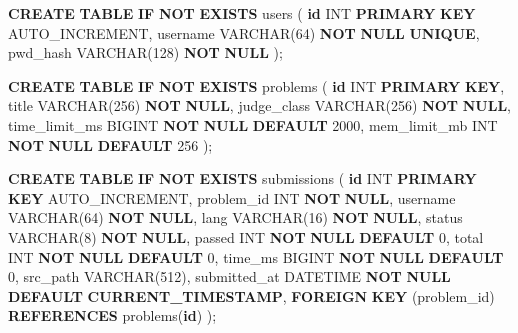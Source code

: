 \documentclass[
  11pt,
]{ctexart}
\newenvironment{Shaded}{\begin{snugshade}}{\end{snugshade}}
\newcommand{\ControlFlowTok}[1]{\textcolor[rgb]{0.13,0.29,0.53}{\textbf{#1}}}
\newcommand{\DataTypeTok}[1]{\textcolor[rgb]{0.13,0.29,0.53}{#1}}
\newcommand{\DecValTok}[1]{\textcolor[rgb]{0.00,0.00,0.81}{#1}}
\newcommand{\FunctionTok}[1]{\textcolor[rgb]{0.13,0.29,0.53}{\textbf{#1}}}
\newcommand{\KeywordTok}[1]{\textcolor[rgb]{0.13,0.29,0.53}{\textbf{#1}}}
\newcommand{\NormalTok}[1]{#1}
\begin{document}
\begin{Shaded}
\begin{Highlighting}[]
\KeywordTok{CREATE} \KeywordTok{TABLE} \ControlFlowTok{IF} \KeywordTok{NOT} \KeywordTok{EXISTS}\NormalTok{ users (}
    \KeywordTok{id}       \DataTypeTok{INT} \KeywordTok{PRIMARY} \KeywordTok{KEY}\NormalTok{ AUTO\_INCREMENT,}
\NormalTok{    username }\DataTypeTok{VARCHAR}\NormalTok{(}\DecValTok{64}\NormalTok{) }\KeywordTok{NOT} \KeywordTok{NULL} \KeywordTok{UNIQUE}\NormalTok{,}
\NormalTok{    pwd\_hash }\DataTypeTok{VARCHAR}\NormalTok{(}\DecValTok{128}\NormalTok{) }\KeywordTok{NOT} \KeywordTok{NULL}
\NormalTok{);}

\KeywordTok{CREATE} \KeywordTok{TABLE} \ControlFlowTok{IF} \KeywordTok{NOT} \KeywordTok{EXISTS}\NormalTok{ problems (}
    \KeywordTok{id}             \DataTypeTok{INT} \KeywordTok{PRIMARY} \KeywordTok{KEY}\NormalTok{,}
\NormalTok{    title          }\DataTypeTok{VARCHAR}\NormalTok{(}\DecValTok{256}\NormalTok{) }\KeywordTok{NOT} \KeywordTok{NULL}\NormalTok{,}
\NormalTok{    judge\_class    }\DataTypeTok{VARCHAR}\NormalTok{(}\DecValTok{256}\NormalTok{) }\KeywordTok{NOT} \KeywordTok{NULL}\NormalTok{,}
\NormalTok{    time\_limit\_ms  BIGINT }\KeywordTok{NOT} \KeywordTok{NULL} \KeywordTok{DEFAULT} \DecValTok{2000}\NormalTok{,}
\NormalTok{    mem\_limit\_mb   }\DataTypeTok{INT}    \KeywordTok{NOT} \KeywordTok{NULL} \KeywordTok{DEFAULT} \DecValTok{256}
\NormalTok{);}

\KeywordTok{CREATE} \KeywordTok{TABLE} \ControlFlowTok{IF} \KeywordTok{NOT} \KeywordTok{EXISTS}\NormalTok{ submissions (}
    \KeywordTok{id}          \DataTypeTok{INT} \KeywordTok{PRIMARY} \KeywordTok{KEY}\NormalTok{ AUTO\_INCREMENT,}
\NormalTok{    problem\_id  }\DataTypeTok{INT}         \KeywordTok{NOT} \KeywordTok{NULL}\NormalTok{,}
\NormalTok{    username    }\DataTypeTok{VARCHAR}\NormalTok{(}\DecValTok{64}\NormalTok{) }\KeywordTok{NOT} \KeywordTok{NULL}\NormalTok{,}
\NormalTok{    lang        }\DataTypeTok{VARCHAR}\NormalTok{(}\DecValTok{16}\NormalTok{) }\KeywordTok{NOT} \KeywordTok{NULL}\NormalTok{,}
\NormalTok{    status      }\DataTypeTok{VARCHAR}\NormalTok{(}\DecValTok{8}\NormalTok{)  }\KeywordTok{NOT} \KeywordTok{NULL}\NormalTok{,}
\NormalTok{    passed      }\DataTypeTok{INT}         \KeywordTok{NOT} \KeywordTok{NULL} \KeywordTok{DEFAULT} \DecValTok{0}\NormalTok{,}
\NormalTok{    total       }\DataTypeTok{INT}         \KeywordTok{NOT} \KeywordTok{NULL} \KeywordTok{DEFAULT} \DecValTok{0}\NormalTok{,}
\NormalTok{    time\_ms     BIGINT      }\KeywordTok{NOT} \KeywordTok{NULL} \KeywordTok{DEFAULT} \DecValTok{0}\NormalTok{,}
\NormalTok{    src\_path    }\DataTypeTok{VARCHAR}\NormalTok{(}\DecValTok{512}\NormalTok{),}
\NormalTok{    submitted\_at DATETIME   }\KeywordTok{NOT} \KeywordTok{NULL} \KeywordTok{DEFAULT} \FunctionTok{CURRENT\_TIMESTAMP}\NormalTok{,}
    \KeywordTok{FOREIGN} \KeywordTok{KEY}\NormalTok{ (problem\_id) }\KeywordTok{REFERENCES}\NormalTok{ problems(}\KeywordTok{id}\NormalTok{)}
\NormalTok{);}
\end{Highlighting}
\end{Shaded}
\end{document}
